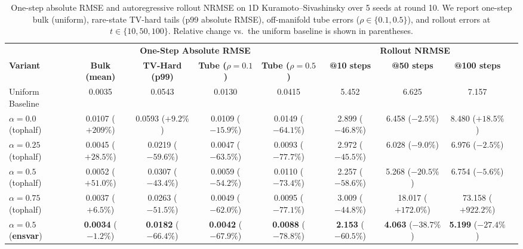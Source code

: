\documentclass{article}
\theoremstyle{plain}
\theoremstyle{definition}
\theoremstyle{remark}
\newcommand{\unif}{\alpha}
\begin{document}
\begin{table}[t]
\caption{One-step absolute RMSE and autoregressive rollout NRMSE on 1D Kuramoto--Sivashinsky over 5 seeds at round 10. We report one-step bulk (uniform), rare-state TV-hard tails (p99 absolute RMSE), off-manifold tube errors ($\rho \in \{0.1, 0.5\}$), and rollout errors at $t \in \{10, 50, 100\}$. Relative change vs.\ the uniform baseline is shown in parentheses.}\label{tab:ks_results}
\vskip 0.15in
\begin{center}
\begin{small}
\begin{tabular}{lcccccccc}
\toprule
& \multicolumn{4}{c}{\textbf{One-Step Absolute RMSE}} & \multicolumn{3}{c}{\textbf{Rollout NRMSE}} \\
\cmidrule(r){2-5} \cmidrule(l){6-8}
\textbf{Variant} & \textbf{Bulk (mean)} & \textbf{TV-Hard (p99)} & \textbf{Tube ($\rho{=}0.1$)} & \textbf{Tube ($\rho{=}0.5$)} & \textbf{@10 steps} & \textbf{@50 steps} & \textbf{@100 steps} \\
\midrule
Uniform Baseline & 0.0035 & 0.0543 & 0.0130 & 0.0415 & 5.452 & 6.625 & 7.157 \\
\midrule
$\unif{=}0.0$ (\textsf{tophalf}) & 0.0107 ($+209\%$) & 0.0593 ($+9.2\%$) & 0.0109 ($-15.9\%$) & 0.0149 ($-64.1\%$) & 2.899 ($-46.8\%$) & 6.458 ($-2.5\%$) & 8.480 ($+18.5\%$) \\
$\unif{=}0.25$ (\textsf{tophalf}) & 0.0045 ($+28.5\%$) & 0.0219 ($-59.6\%$) & 0.0047 ($-63.5\%$) & 0.0093 ($-77.7\%$) & 2.972 ($-45.5\%$) & 6.028 ($-9.0\%$) & 6.976 ($-2.5\%$) \\
$\unif{=}0.5$ (\textsf{tophalf}) & 0.0052 ($+51.0\%$) & 0.0307 ($-43.4\%$) & 0.0059 ($-54.2\%$) & 0.0110 ($-73.4\%$) & 2.257 ($-58.6\%$) & 5.268 ($-20.5\%$) & 6.754 ($-5.6\%$) \\
$\unif{=}0.75$ (\textsf{tophalf}) & 0.0037 ($+6.5\%$) & 0.0263 ($-51.5\%$) & 0.0049 ($-62.0\%$) & 0.0095 ($-77.1\%$) & 3.009 ($-44.8\%$) & 18.017 ($+172.0\%$) & 73.158 ($+922.2\%$) \\
$\unif{=}0.5$ (\textbf{\textsf{ensvar}}) & \textbf{0.0034} ($-1.2\%$) & \textbf{0.0182} ($-66.4\%$) & \textbf{0.0042} ($-67.9\%$) & \textbf{0.0088} ($-78.8\%$) & \textbf{2.153} ($-60.5\%$) & \textbf{4.063} ($-38.7\%$) & \textbf{5.199} ($-27.4\%$) \\
\bottomrule
\end{tabular}
\end{small}
\end{center}
\vskip -0.1in
\end{table}
\end{document}
